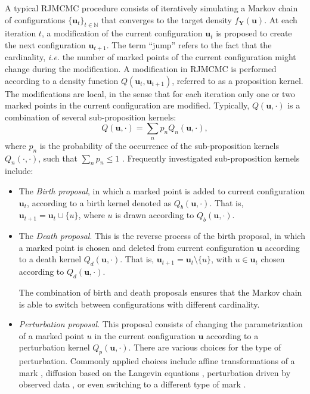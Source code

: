 \documentclass[journal]{IEEEtran}
\begin{document}
A typical RJMCMC procedure consists of iteratively simulating a Markov
chain of configurations $\{ \mathbf{u}_t \}_{t \in \mathbb{N}}$ that
converges to the target density $f_{\mathbf{Y}}(\mathbf{u})$. At each
iteration $t$, a modification of the current configuration
$\mathbf{u}_t$ is proposed to create the next configuration
$\mathbf{u}_{t+1}$. The term ``jump'' refers to the fact that the
cardinality, \textit{i.e.} the number of marked points of the current
configuration might change during the modification. A modification in
RJMCMC is performed according to a density function
$Q(\mathbf{u}_t, \mathbf{u}_{t+1})$, referred to as a proposition
kernel. The modifications are local, in the sense that for each
iteration only one or two marked points in the current configuration
are modified. Typically, $Q(\mathbf{u}, \cdot)$ is a combination of
several sub-proposition kernels:
\begin{equation}
  \label{eq:sub-kernels}
  Q(\mathbf{u}, \cdot) = \sum_n p_n Q_n (\mathbf{u}, \cdot),
\end{equation}
where $p_n$ is the probability of the occurrence of the
sub-proposition kernels $Q_n(\cdot, \cdot)$, such that
$\sum_n p_n \le 1$ \cite{descombes2013stochastic}
\cite{verdie2014detecting}. Frequently investigated sub-proposition
kernels include:

\begin{itemize}

\item The \textit{Birth proposal}, in which a marked point is added to
  current configuration $\mathbf{u}_t$, according to a birth kernel
  denoted as $Q_{b}(\mathbf{u}, \cdot)$. That is,
  $\mathbf{u}_{t+1} = \mathbf{u}_t \cup \{u\}$, where $u$ is drawn
  according to $Q_{b}(\mathbf{u}, \cdot)$.

\item The \textit{Death proposal}. This is the reverse process of the
  birth proposal, in which a marked point is chosen and deleted from
  current configuration $\mathbf{u}$ according to a death kernel
  $Q_{d}(\mathbf{u}, \cdot)$. That is,
  $\mathbf{u}_{t+1} = \mathbf{u}_t \setminus \{u\}$, with
  $u \in \mathbf{u}_t$ chosen according to $Q_{d}(\mathbf{u}, \cdot)$.

  The combination of birth and death proposals ensures that the Markov
  chain is able to switch between configurations with different
  cardinality.

\item \textit{Perturbation proposal}. This proposal consists of
  changing the parametrization of a marked point $u$ in the current
  configuration $\mathbf{u}$ according to a perturbation kernel
  $Q_{p}(\mathbf{u}, \cdot)$. There are various choices for the type
  of perturbation. Commonly applied choices include affine
  transformations of a mark \cite{descombes2013stochastic}, diffusion
  based on the Langevin equations \cite{lafarge2010geometric},
  perturbation driven by observed data \cite{tu2002image}, or even
  switching to a different type of mark \cite{lafarge2010geometric}
  \cite{green1995reversible}.

\end{itemize}
\end{document}
